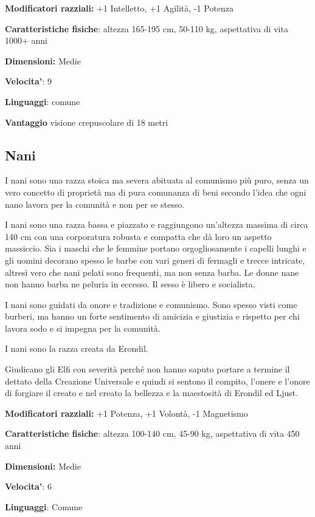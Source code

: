 \documentclass[a4paper,11pt,twoside,openany]{book}
\begin{document}
\textbf{Modificatori razziali:} +1 Intelletto, +1 Agilità, -1 Potenza

\textbf{Caratteristiche fisiche}: altezza 165-195 cm, 50-110 kg, aspettativa
di vita 1000+ anni

\textbf{Dimensioni:} Medie

\textbf{Velocita'}: 9

\textbf{Linguaggi}: comune

\textbf{Vantaggio} visione crepuscolare di 18 metri

\subsection{Nani}

\label{nani}

I nani sono una razza stoica ma severa abituata al comunismo più puro, senza un vero concetto di proprietà ma di pura comunanza di beni secondo l'idea che ogni nano lavora per la comunità e non per se stesso.

I nani sono una razza bassa e piazzato e raggiungono un'altezza massima di circa 140 cm con una corporatura robusta e compatta che dà loro un aspetto massiccio. Sia i maschi che le femmine portano orgogliosamente i capelli lunghi e gli uomini decorano spesso le barbe con vari generi di fermagli e trecce intricate, altresì vero che nani pelati sono frequenti, ma non senza barba. Le donne nane non hanno barba ne peluria in eccesso. Il sesso è libero e socialista.

I nani sono guidati da onore e tradizione e comunismo. Sono spesso visti come burberi, ma hanno un forte sentimento di amicizia e giustizia e rispetto per chi lavora sodo e si impegna per la comunità.

I nani sono la razza creata da Erondil.

Giudicano gli Elfi con severità perché non hanno saputo portare a termine il dettato della Creazione Universale e quindi si sentono il compito, l'onere e l'onore di forgiare il creato e nel creato la bellezza e la maestosità di Erondil ed Ljust. 

\textbf{Modificatori razziali:} +1 Potenza, +1 Volontà, -1 Magnetismo

\textbf{Caratteristiche fisiche}: altezza 100-140 cm, 45-90 kg, aspettativa
di vita 450 anni

\textbf{Dimensioni:} Medie

\textbf{Velocita'}: 6

\textbf{Linguaggi}: Comune
\end{document}
